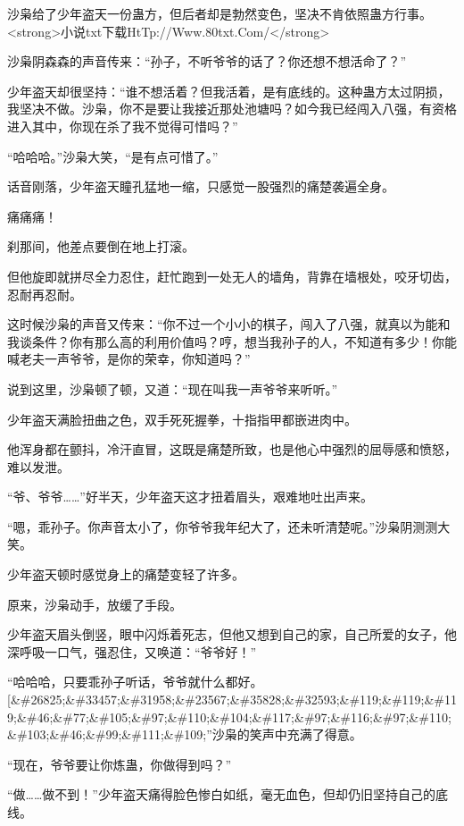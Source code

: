 
\begin{this_body}

沙枭给了少年盗天一份蛊方，但后者却是勃然变色，坚决不肯依照蛊方行事。<strong>小说txt下载HtTp://Www.80txt.Com/</strong>

沙枭阴森森的声音传来：“孙子，不听爷爷的话了？你还想不想活命了？”

少年盗天却很坚持：“谁不想活着？但我活着，是有底线的。这种蛊方太过阴损，我坚决不做。沙枭，你不是要让我接近那处池塘吗？如今我已经闯入八强，有资格进入其中，你现在杀了我不觉得可惜吗？”

“哈哈哈。”沙枭大笑，“是有点可惜了。”

话音刚落，少年盗天瞳孔猛地一缩，只感觉一股强烈的痛楚袭遍全身。

痛痛痛！

刹那间，他差点要倒在地上打滚。

但他旋即就拼尽全力忍住，赶忙跑到一处无人的墙角，背靠在墙根处，咬牙切齿，忍耐再忍耐。

这时候沙枭的声音又传来：“你不过一个小小的棋子，闯入了八强，就真以为能和我谈条件？你有那么高的利用价值吗？哼，想当我孙子的人，不知道有多少！你能喊老夫一声爷爷，是你的荣幸，你知道吗？”

说到这里，沙枭顿了顿，又道：“现在叫我一声爷爷来听听。”

少年盗天满脸扭曲之色，双手死死握拳，十指指甲都嵌进肉中。

他浑身都在颤抖，冷汗直冒，这既是痛楚所致，也是他心中强烈的屈辱感和愤怒，难以发泄。

“爷、爷爷……”好半天，少年盗天这才扭着眉头，艰难地吐出声来。

“嗯，乖孙子。你声音太小了，你爷爷我年纪大了，还未听清楚呢。”沙枭阴测测大笑。

少年盗天顿时感觉身上的痛楚变轻了许多。

原来，沙枭动手，放缓了手段。

少年盗天眉头倒竖，眼中闪烁着死志，但他又想到自己的家，自己所爱的女子，他深呼吸一口气，强忍住，又唤道：“爷爷好！”

“哈哈哈，只要乖孙子听话，爷爷就什么都好。[\&\#26825;\&\#33457;\&\#31958;\&\#23567;\&\#35828;\&\#32593;\&\#119;\&\#119;\&\#119;\&\#46;\&\#77;\&\#105;\&\#97;\&\#110;\&\#104;\&\#117;\&\#97;\&\#116;\&\#97;\&\#110;\&\#103;\&\#46;\&\#99;\&\#111;\&\#109;”沙枭的笑声中充满了得意。

“现在，爷爷要让你炼蛊，你做得到吗？”

“做……做不到！”少年盗天痛得脸色惨白如纸，毫无血色，但却仍旧坚持自己的底线。


\end{this_body}
